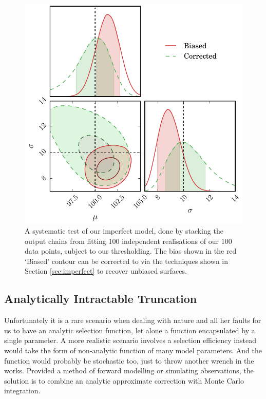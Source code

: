 \documentclass[a4paper,fleqn,usenatbib]{mnras}
\begin{document}
\begin{figure}
	\begin{center}
		\includegraphics[width=\columnwidth]{example/imperfect.pdf}
	\end{center}
	\caption{A systematic test of our imperfect model, done by stacking the output chains from fitting 100 independent realisations of our 100 data points, subject to our thresholding. The bias shown in the red `Biased' contour can be corrected to via the techniques shown in Section \ref{sec:imperfect} to recover unbiased surfaces.}
	\label{fig:imperfect}
\end{figure}












\subsection{Analytically Intractable Truncation}
\label{sec:real}
Unfortunately it is a rare scenario when dealing with nature and all her faults for us to have an analytic selection function, let alone a function encapsulated by a single parameter. A more realistic scenario involves a selection efficiency instead would take the form of non-analytic function of many model parameters. And the function would probably be stochastic too, just to throw another wrench in the works. Provided a method of forward modelling or simulating observations, the solution is to combine an analytic approximate correction with Monte Carlo integration.
\end{document}
